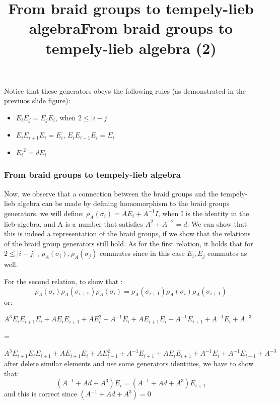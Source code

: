 \documentclass{article}
\begin{document}
{\begin{figure}
\end{figure}
Notice that these generators obeys the following rules (as demonstrated in the previuos slide figure):
\begin{itemize}
\item \(E_{i}E_{j} = E_{j}E_{i}\), when \(2 \leq |i-j\)
\item \(E_{i}E_{i+1}E_{i} = E_{i}\), \(E_{i}E_{i-1}E_{i} = E_{i}\)
\item \({E_{i}}^2 = dE_{i}\)
\end{itemize}


\subsubsection{From braid groups to tempely-lieb algebra }
\title{From braid groups to tempely-lieb algebra}
Now, we observe that a connection between the braid groups and the tempely-lieb algebra can
be made by defining homomorphism to the braid groups generators. we will define:
\(\rho_{A}(\sigma_{i}) = AE_{i} +A^{-1}I\), when I is the identity in the lieb-algebra,
and A is a number that satisfies \(A^{2}+A^{-2}=d\).
We can show that this is indeed a representation of the braid groups, if we show that the relations
of the braid group generators still hold.
As for the first relation, it holds that for \(2 \leq |i-j|\) , \(\rho_{A}(\sigma_{i}),\rho_{A}(\sigma_{j})\) commutes since in this case \(E_{i},E_{j}\) commutes as well.

\title{From braid groups to tempely-lieb algebra (2)}
For the second relation, to show that :
\begin{displaymath}
\rho_{A}(\sigma_{i})\rho_{A}(\sigma_{i+1})\rho_{A}(\sigma_{i})= \rho_{A}(\sigma_{i+1})\rho_{A}(\sigma_{i})\rho_{A}(\sigma_{i+1})
\end{displaymath}
or:

\(
A^{3}E_{i}E_{i+1}E_{i} +AE_{i}E_{i+1} + AE_{i}^{2} + A^{-1}E_{i} +AE_{i+1}E_{i}+A^{-1}E_{i+1} + A^{-1}E_{i} + A^{-3}\)

=

\(
A^{3}E_{i+1}E_{i}E_{i+1} +AE_{i+1}E_{i} + AE_{i+1}^{2} + A^{-1}E_{i+1} +AE_{i}E_{i+1}+A^{-1}E_{i} + A^{-1}E_{i+1} + A^{-3}
\)
after delete similar elements and use some generators identities, we have to show that:
\begin{displaymath}
(A^{-1}+Ad+A^{3})E_{i}= (A^{-1}+Ad+A^{3})E_{i+1}
\end{displaymath}
and this is correct since \((A^{-1}+Ad+A^{3}) = 0\)



}
\end{document}
